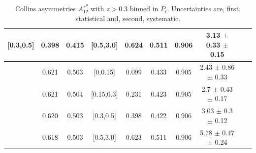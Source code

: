 \documentclass[aps,prX,preprint,groupedaddress,linenumbers]{revtex4-1}
\begin{document}
\begin{table}[H]
\begin{tabular}{|c| c| c| c| c| c| c| c| c| c|}
[0.3,0.5]	&	0.398	&	0.415	&	[0.5,3.0]	&	0.624	&	0.511	&	0.906	&3.13  $\pm$ 0.33  $\pm$ 0.15    	\\ \hline
\hline
[0.5,3.0]	&	0.621	&	0.503	&	[0,0.15]	&	0.099	&	0.433	&	0.905	&2.43  $\pm$ 0.86  $\pm$ 0.33    	\\ \hline
[0.5,3.0]	&	0.621	&	0.504	&	[0.15,0.3]	&	0.231	&	0.423	&	0.905	&2.7  $\pm$ 0.43  $\pm$ 0.17     	\\ \hline
[0.5,3.0]	&	0.620	&	0.503	&	[0.3,0.5]	&	0.398	&	0.422	&	0.906	&3.03  $\pm$ 0.3  $\pm$ 0.12     	\\ \hline
[0.5,3.0]	&	0.618	&	0.503	&	[0.5,3.0]	&	0.623	&	0.511	&	0.906	&5.78  $\pm$ 0.47  $\pm$ 0.24    	\\ \hline
\end{tabular}
\caption[Collins asymmetries $A_{12}^{\pi^0}$ with $z>0.3$ binned in $P_t$]{Collins asymmetries $A_{12}^{\pi^0}$ with $z>0.3$ binned in $P_t$. Uncertainties are, first, statistical and, second, systematic.}\label{tab:finaletaptbin2}
\end{table}
\end{document}

